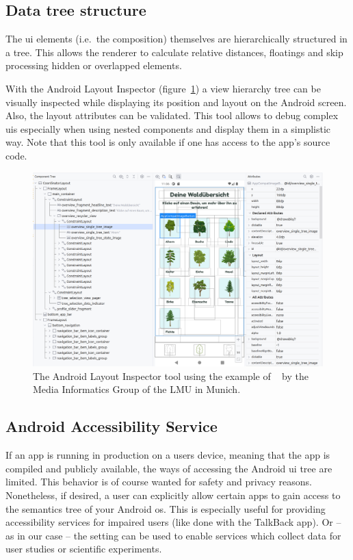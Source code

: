 \subsection{Data tree structure}
\label{subsec:data-tree-structure}

The \gls{ui} elements (i.e.\ the composition) themselves are hierarchically structured in a tree.
This allows the renderer to calculate relative distances, floatings and skip processing hidden or overlapped elements.

With the Android Layout Inspector (figure~\ref{fig:android_layout_inspector}) a view hierarchy tree can be visually inspected while displaying its position and layout on the Android screen.
Also, the layout attributes can be validated.
This tool allows to debug complex \gls{ui}s especially when using nested components and display them in a simplistic way.
Note that this tool is only available if one has access to the app's source code.

\begin{figure}[htbp!]
    \centering
    \includegraphics[width=\textwidth]{graphics/android_layout_inspector}
    \caption{The Android Layout Inspector tool using the example of ~\cite{mimuc_app_ins_gruene} by the Media Informatics Group of the LMU in Munich.}
    \label{fig:android_layout_inspector}
\end{figure}

\subsection{Android Accessibility Service}
\label{subsec:android-accessibility-service}

If an app is running in production on a users device, meaning that the app is compiled and publicly available, the ways of accessing the Android \gls{ui} tree are limited.
This behavior is of course wanted for safety and privacy reasons.
Nonetheless, if desired, a user can explicitly allow certain apps to gain access to the semantics tree of your Android \gls{os}.
This is especially useful for providing accessibility services for impaired users (like done with the TalkBack app).
Or -- as in our case -- the setting can be used to enable services which collect data for user studies or scientific experiments.

